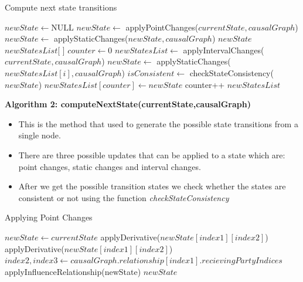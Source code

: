 \documentclass{article}
\begin{document}
\begin{algorithm}[!h]
	\caption{Compute next state transitions}\label{nextstate}
	\begin{algorithmic}[1]
		\State $newState \gets \text{NULL}$ 
		\State $newState \gets$ applyPointChanges($currentState,causalGraph$)
		\State $newState \gets$ applyStaticChanges($newState,causalGraph$)
		\State \Return $newState$
		\EndIf
		\State $newStatesList$[ ]
		\State $counter \gets 0$
		\State $newStatesList \gets$ applyIntervalChanges($currentState,causalGraph$)
		\State $newState \gets$ applyStaticChanges($newStatesList[i],causalGraph$)
		\State $isConsistent \gets$ checkStateConsistency($newState$)
		\State $newStatesList[counter] \gets newState$
		\State counter++
		\EndIf
		\EndFor
		\State \Return $newStatesList$
		\EndProcedure
	\end{algorithmic}
\end{algorithm}
\textbf{Algorithm 2: computeNextState(currentState,causalGraph)}
\begin{itemize}
	\item This is the method that used to generate the possible state transitions from a single node.
	\item There are three possible updates that can be applied to a state which are: point changes, static changes and interval changes.
	\item After we get the possible transition states we check whether the states are consistent or not using the function \textit{checkStateConsistency}
\end{itemize}

\begin{algorithm}[!h]
	\caption{Applying Point Changes}\label{pointchanges}
	\begin{algorithmic}[1]
		\State $newState \gets currentState$
		\State applyDerivative($newState[index1][index2]$)
		\EndIf
		\State applyDerivative($newState[index1][index2]$)
		\EndIf
		\EndIf
		\EndFor
		\EndFor
		\State $index2,index3 \gets causalGraph.relationship[index1].recievingPartyIndices$
		\State applyInfluenceRelationship(newState)
		\EndIf
		\EndIf
		\EndFor
		\State \Return $newState$
		\EndProcedure
	\end{algorithmic}
\end{algorithm}
\end{document}
